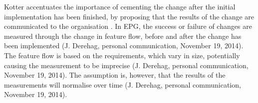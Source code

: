 \documentclass[final_report_innit.tex]{subfiles}
\begin{document}
Kotter accentuates the importance of cementing the change after the initial implementation has been finished, by proposing that the results of the change are communicated to the organisation \cite{kotter1995leading}. In EPG, the success or failure of changes are measured through the change in feature flow, before and after the change has been implemented (J. Derehag, personal communication, November 19, 2014). The feature flow is based on the requirements, which vary in size, potentially causing the measurement to be imprecise (J. Derehag, personal communication, November 19, 2014). The assumption is, however, that the results of the measurements will normalise over time (J. Derehag, personal communication, November 19, 2014).   
\end{document}
